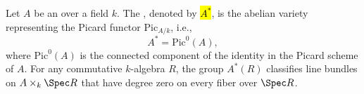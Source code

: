 \begin{definition} \label{definition:dual_abelian_variety_of_an_abelian_variety_over_a_field}
    Let $A$ be an  over a field $k$. The , denoted by \hl{$A^*$}, is the abelian variety representing the Picard functor $\mathrm{Pic}_{A/k}$, i.e.,
    $$A^* = \mathrm{Pic}^0(A),$$
    where $\mathrm{Pic}^0(A)$ is the connected component of the identity in the Picard scheme of $A$. For any commutative $k$-algebra $R$, the group $A^*(R)$ classifies line bundles on $A \times_k \Spec R$ that have degree zero on every fiber over $\Spec R$.
\end{definition}